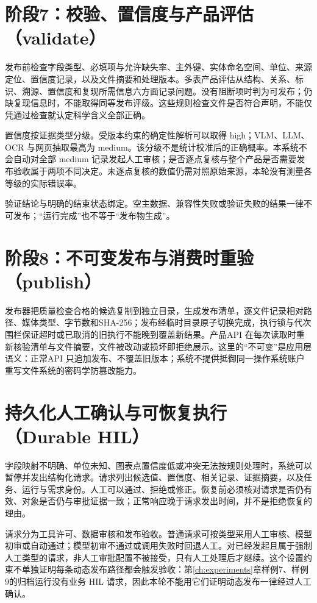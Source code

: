 \section{阶段7：校验、置信度与产品评估（validate）}\label{sec:stage7-validate}

发布前检查字段类型、必填项与允许缺失率、主外键、实体命名空间、单位、来源定位、置信度记录，以及文件摘要和处理版本。多表产品评估从结构、关系、标识、溯源、置信度和复现所需信息六方面记录问题。没有阻断项时判为可发布；仍缺复现信息时，不能取得同等发布评级。这些规则检查文件是否符合声明，不能仅凭通过检查就认定科学含义全部正确。

置信度按证据类型分级。受版本约束的确定性解析可以取得 high；VLM、LLM、OCR 与网页抽取最高为 medium。该分级不是统计校准后的正确概率。本系统不会自动对全部 medium 记录发起人工审核；是否逐点复核与整个产品是否需要发布验收属于两项不同决定。未逐点复核的数值仍需对照原始来源，本轮没有测量各等级的实际错误率。

验证结论与明确的结束状态绑定。空主数据、兼容性失败或验证失败的结果一律不可发布；“运行完成”也不等于“发布物生成”。

\section{阶段8：不可变发布与消费时重验（publish）}\label{sec:stage8-publish}

发布器把质量检查合格的候选复制到独立目录，生成发布清单，逐文件记录相对路径、媒体类型、字节数和SHA-256；发布经临时目录原子切换完成，执行锁与代次围栏保证超时或已取消的旧执行不能晚到覆盖新结果。产品API 在每次读取时重新核验清单与文件摘要，文件被改动或损坏即拒绝展示。这里的“不可变”是应用层语义：正常API 只追加发布、不覆盖旧版本；系统不提供抵御同一操作系统账户重写文件系统的密码学防篡改能力。

\section{持久化人工确认与可恢复执行（Durable HIL）}\label{sec:hil}

字段映射不明确、单位未知、图表点置信度低或冲突无法按规则处理时，系统可以暂停并发出结构化请求。请求列出候选值、置信度、相关记录、证据摘要，以及任务、运行与需求身份。人工可以通过、拒绝或修正。恢复前必须核对请求是否仍有效、对象是否仍与审批证据一致；正常响应晚于请求发出时间，并不是拒绝恢复的理由。

请求分为工具许可、数据审核和发布验收。普通请求可按类型采用人工审核、模型初审或自动通过；模型初审不通过或调用失败时回退人工。对已经发起且属于强制人工类型的请求，非人工审批配置不被接受，只有人工处理后才继续。这个设置约束不单独证明每条动态发布路径都会触发验收：第\ref{ch:experiments}章样例7、样例9的归档运行没有业务 HIL 请求，因此本轮不能用它们证明动态发布一律经过人工确认。

